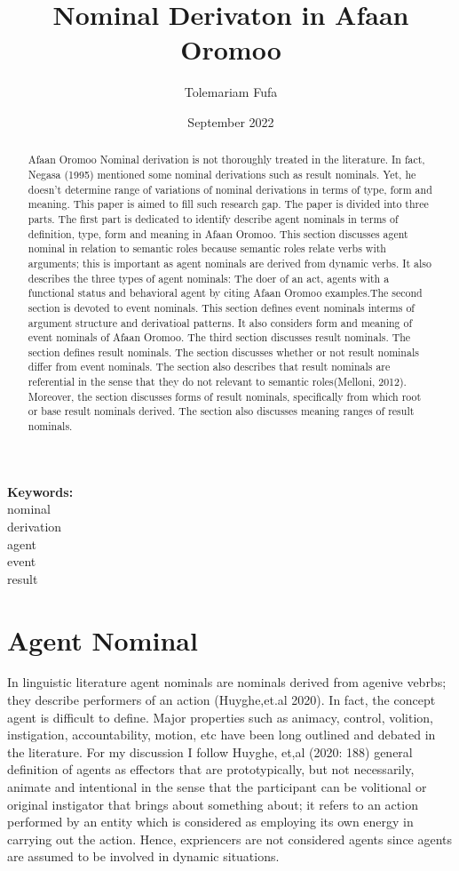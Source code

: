 \documentclass[11pt,a4paper]{article}
\title {Nominal Derivaton in Afaan Oromoo}
\author {Tolemariam Fufa}
\date{September 2022}
\begin{document}
\newcommand\keywords[1]{%
	\begingroup
	\let\and\\
	\par
	\noindent\textbf{Keywords:}\\#1\par
	\endgroup
}
\maketitle
\begin{abstract}
	Afaan Oromoo Nominal derivation is not thoroughly treated in the literature. In fact, Negasa (1995) mentioned some nominal derivations such as result nominals. Yet, he doesn’t determine range of variations of nominal derivations in terms of type, form and meaning. This paper is aimed to fill such research gap. The paper is divided into three parts. The first part is dedicated to identify describe agent nominals in terms of definition, type, form and meaning in Afaan Oromoo. This section discusses agent nominal in relation to semantic roles because semantic roles relate verbs with arguments; this is important as agent nominals are derived from dynamic verbs. It also describes the three types of agent nominals: The doer of an act, agents with a functional status and behavioral agent by citing Afaan Oromoo examples.The second section is devoted to event nominals. This section defines event nominals interms of argument structure and derivatioal patterns. It also considers form and meaning of event nominals of Afaan Oromoo. The third section discusses result nominals. The section defines result nominals. The section discusses whether or not result nominals differ from event nominals. The section also describes that result nominals are referential in the sense that they do not relevant to semantic roles(Melloni, 2012). Moreover, the section discusses forms of result nominals, specifically from which root or base result nominals derived. The section also discusses meaning ranges of result nominals.
		
\end{abstract}
\keywords{nominal \and derivation \and agent \and event \and result}
\newpage
\section{Agent Nominal}
In linguistic literature agent nominals are nominals derived from agenive vebrbs; they describe performers of an action (Huyghe,et.al 2020). In fact, the concept agent is difficult to define. Major properties  such as animacy, control, volition, instigation, accountability, motion, etc have been long outlined and debated in the literature. For my discussion I follow Huyghe, et,al (2020: 188) general definition of agents as effectors that are prototypically, but not necessarily, animate and intentional in the sense that the participant can be volitional or original instigator that brings about something about; it refers to an action performed by an entity which is considered as employing its own energy in carrying out the action. Hence, expriencers are not considered  agents since agents are assumed to be involved in dynamic situations. 
\end{document}
